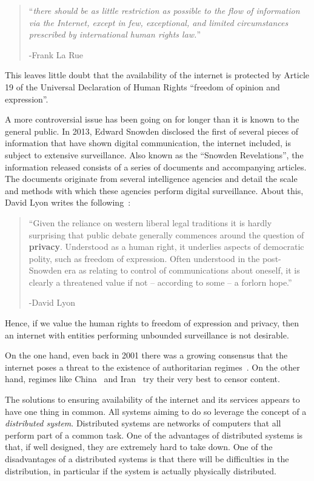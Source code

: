 \documentclass[a4paper,11pt]{book}
\theoremstyle{definition}
\begin{document}
\begin{quote}
    ``\textit{there should be as little restriction as possible  to  the  flow  of  information  via  the  Internet,
    except  in  few,  exceptional,  and  limited  circumstances  prescribed  by  international  human  rights  law.}'' 
    
    -Frank La Rue  
\end{quote}

This leaves little doubt that the availability of the internet is protected by Article 19 of
the Universal Declaration of Human Rights ``freedom of opinion and expression''\cite{assembly1948universal}.

A more controversial issue has been going on for longer than it is known to the general public.
In 2013, Edward Snowden disclosed the first of several pieces of information that
have shown digital communication, the internet included, is subject to extensive surveillance.
Also known as the ``Snowden Revelations'', the information released consists of a series
of documents and accompanying articles. The documents originate from several intelligence 
agencies and detail the scale and methods with which these agencies perform digital
surveillance. 
About this, David Lyon writes the following~\cite{lyon2014surveillance}:

\begin{quote}
    ``Given the reliance on western liberal legal traditions
    it is hardly surprising that public debate generally 
    commences around the question of \textbf{privacy}.
    Understood as a human right, it underlies aspects of democratic polity,
    such as freedom of expression. 
    Often understood in the post-Snowden era as relating to 
    control of communications about oneself, 
    it is clearly a threatened value if not – according to some – a forlorn hope.''

    -David Lyon
\end{quote}

Hence, if we value the human rights to freedom of expression and privacy, then an internet
with entities performing unbounded surveillance is not desirable. 

On the one hand, even back in 2001 there was a growing consensus that the internet poses
a threat to the existence of authoritarian regimes~\cite{kalathil2001internet}. 
On the other hand, regimes like China~\cite{endeshaw2004internet} and Iran~\cite{kimppa2010emancipatory}
try their very best to censor content. 

The solutions to ensuring availability of the internet and its services
appears to have one thing in common. All systems aiming to do so leverage the concept of
a \emph{distributed system}. Distributed systems are networks of computers that all perform part
of a common task. One of the advantages of distributed systems is that, if well designed, they are
extremely hard to take down. One of the disadvantages of a distributed systems is that there will
be difficulties in the distribution, in particular if the system is actually physically
distributed. 
\end{document}
